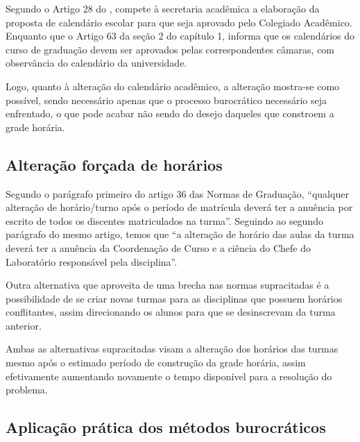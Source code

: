 Segundo o Artigo 28 do \cite[Estatuto da UENF]{Estatuto2002}, compete à secretaria acadêmica a elaboração da proposta de calendário escolar para que seja aprovado pelo Colegiado Acadêmico. Enquanto que o Artigo 63 da seção 2 do capítulo 1, informa que os calendários do curso de graduação devem ser aprovados pelas correspondentes câmaras, com observância do calendário da universidade.

Logo, quanto à alteração do calendário acadêmico, a alteração mostra-se como possível, sendo necessário apenas que o processo burocrático necessário seja enfrentado, o que pode acabar não sendo do desejo daqueles que constroem a grade horária.

\subsection{Alteração forçada de horários} \label{ssec:burocracia-troca} %

Segundo o parágrafo primeiro do artigo 36 das Normas de Graduação, ``qualquer alteração de horário/turno após o período de matrícula deverá ter a anuência por escrito de todos os discentes matriculados na turma''. Seguindo ao segundo parágrafo do mesmo artigo, temos que ``a alteração de horário das aulas da turma deverá ter a anuência da Coordenação de Curso e a ciência do Chefe do Laboratório responsável pela disciplina''.

Outra alternativa que aproveita de uma brecha nas normas supracitadas é a possibilidade de se criar novas turmas para as disciplinas que possuem horários conflitantes, assim direcionando os alunos para que se desinscrevam da turma anterior.

Ambas as alternativas supracitadas visam a alteração dos horários das turmas mesmo após o estimado período de construção da grade horária, assim efetivamente aumentando novamente o tempo disponível para a resolução do problema.


\subsection{Aplicação prática dos métodos burocráticos} %

